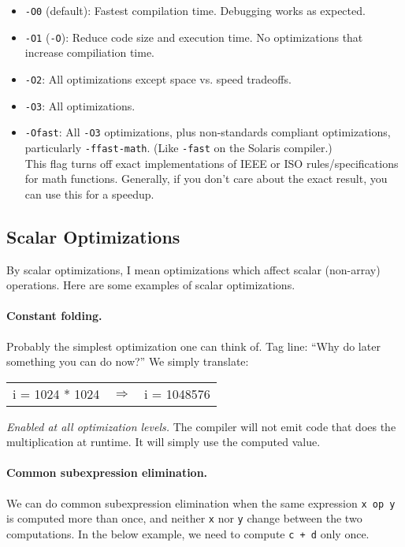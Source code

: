 \begin{itemize}
\item {\tt -O0} (default): Fastest compilation time. Debugging works as expected.
\item {\tt -O1} ({\tt -O}): Reduce code size and execution time.
 No optimizations that increase compiliation time.
\item {\tt -O2}: All optimizations except space vs. speed tradeoffs.
\item {\tt -O3}: All optimizations.
\item {\tt -Ofast}: All {\tt -O3} optimizations, plus non-standards compliant optimizations,
      particularly {\tt -ffast-math}. (Like {\tt -fast} on the Solaris compiler.)\\[1em]
  This flag turns off exact implementations of IEEE or ISO rules/specifications for math
  functions. Generally, if you don't care about the exact result, you can use this for
  a speedup.
\end{itemize}

\subsection*{Scalar Optimizations} 
By scalar optimizations, I mean optimizations
which affect scalar (non-array) operations. Here are some examples of scalar
optimizations.

\paragraph{Constant folding.} Probably the simplest optimization one can think of.
Tag line: ``Why do later something you can do now?'' We simply translate:

\begin{center}
\begin{tabular}{lll}
i = 1024 * 1024 &
$\Longrightarrow$ &
i = 1048576
\end{tabular}
\end{center}

\noindent \emph{Enabled at all optimization levels.} The compiler will not emit
code that does the multiplication at runtime. It will simply use the
computed value.

\paragraph{Common subexpression elimination.} We can do common subexpression elimination
when the same expression {\tt x op y} is computed more than once, and
neither {\tt x} nor {\tt y} change between the two computations. In the
below example, we need to compute {\tt c + d} only once.


